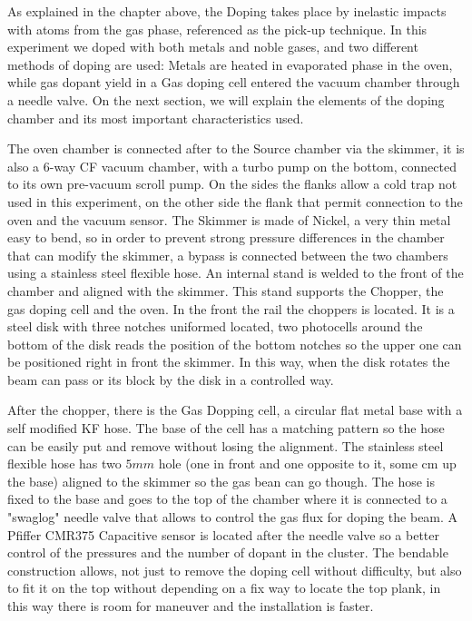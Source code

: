 As explained in the chapter above, the Doping takes place by inelastic impacts with atoms from the gas phase, referenced as the pick-up technique. In this experiment we doped with both metals and noble gases, and two different methods of doping are used: Metals are heated in evaporated phase in the oven, while gas dopant yield in a Gas doping cell entered the vacuum chamber through a needle valve. On the next section, we will explain the elements of the doping chamber and its most important characteristics used.

The oven chamber is connected after to the Source chamber via the skimmer, it is also a 6-way CF vacuum chamber, with a turbo pump  on the bottom, connected to its own pre-vacuum scroll pump. On the sides the flanks allow a cold trap not used in this experiment, on the other side  the flank that permit connection to the oven and the vacuum sensor. The Skimmer is made of Nickel, a very thin metal easy to bend, so in order to prevent strong pressure differences in the chamber that can modify the skimmer, a bypass is connected between the two chambers using a stainless steel flexible hose.  
An internal stand is welded to the front of the chamber and aligned with the skimmer. This stand supports the Chopper, the gas doping cell and the oven.
In the front the rail the choppers is located.  It is a steel  disk with three notches uniformed located, two photocells around the bottom of the disk reads the position of the bottom notches so the upper one can be positioned right in front the skimmer. In this way, when the disk rotates the beam can pass or its block by the disk  in a controlled way.  

After the chopper, there is the Gas Dopping cell, a circular flat metal base with a self modified KF hose. The base of the cell has a matching pattern so the hose can be easily put and remove without losing the alignment. The stainless steel flexible hose has two $5mm$ hole (one in front and one opposite to it, some cm up the base) aligned to the skimmer so the gas bean can go though. The hose is fixed to the base and goes to the top of the chamber where it is connected to a "swaglog" needle valve that allows to control the gas flux for doping the beam. A Pfiffer CMR375 Capacitive sensor is located after the needle valve so a better control of the pressures and  the number of dopant in the cluster. The bendable construction allows, not just to remove the doping cell without difficulty, but also to fit it on the top without depending on a fix way to locate the top plank, in this way there is room for maneuver and the installation is faster.

